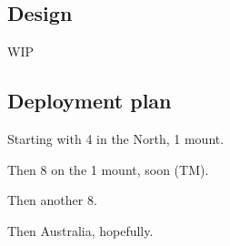 \begin{colsection}
\subsection{Design}
\label{sec:goto_design}
\begin{colsection}

WIP

\end{colsection}


\subsection{Deployment plan}
\label{sec:goto_expansion}
\begin{colsection}

Starting with 4 in the North, 1 mount.

Then 8 on the 1 mount, soon (TM).

Then another 8.

Then Australia, hopefully.

\end{colsection}


\end{colsection}

